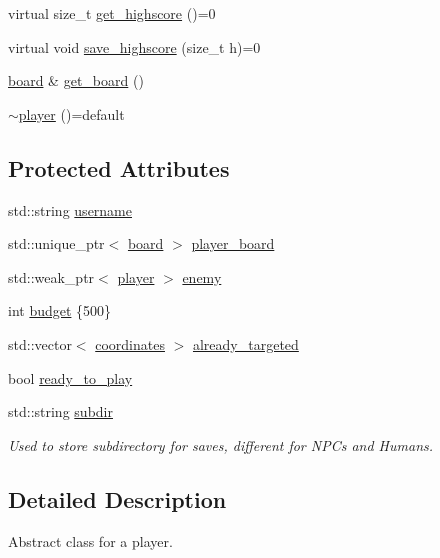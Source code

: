 \begin{DoxyCompactItemize}
\item 
virtual size\+\_\+t \hyperlink{classbattle__ship_1_1player_a9b74e59f4b120d38ad591dba6a1d1ba7}{get\+\_\+highscore} ()=0
\item 
virtual void \hyperlink{classbattle__ship_1_1player_a928538249678aea5402f8c673671e995}{save\+\_\+highscore} (size\+\_\+t h)=0
\item 
\hyperlink{classbattle__ship_1_1board}{board} \& \hyperlink{classbattle__ship_1_1player_a57dacb55b2c506191d3d8426097c3c6a}{get\+\_\+board} ()
\item 
\hyperlink{classbattle__ship_1_1player_afbb6b6e880864bf7a36f21a95665a6c7}{$\sim$player} ()=default
\end{DoxyCompactItemize}
\subsection*{Protected Attributes}
\begin{DoxyCompactItemize}
\item 
std\+::string \hyperlink{classbattle__ship_1_1player_aed786567891bcafecb8610e12fb5d413}{username}
\item 
std\+::unique\+\_\+ptr$<$ \hyperlink{classbattle__ship_1_1board}{board} $>$ \hyperlink{classbattle__ship_1_1player_a7a463dddbc0cd8e9dfa3d2c41687e59e}{player\+\_\+board}
\item 
std\+::weak\+\_\+ptr$<$ \hyperlink{classbattle__ship_1_1player}{player} $>$ \hyperlink{classbattle__ship_1_1player_af01292346caaf209039b6490ae18d8aa}{enemy}
\item 
int \hyperlink{classbattle__ship_1_1player_a01f047aac5fcca92ff1e42d4d1e398c9}{budget} \{500\}
\item 
std\+::vector$<$ \hyperlink{structbattle__ship_1_1coordinates}{coordinates} $>$ \hyperlink{classbattle__ship_1_1player_ac0905b76a660cd06e5fd45f4960d48f9}{already\+\_\+targeted}
\item 
bool \hyperlink{classbattle__ship_1_1player_a48a3f8c692c7ea1def384c39b9b65e85}{ready\+\_\+to\+\_\+play}
\item 
std\+::string \hyperlink{classbattle__ship_1_1player_a5cb155ee3d722244c44bf71e5e2440c4}{subdir}
\begin{DoxyCompactList}\small\item\em Used to store subdirectory for saves, different for N\+P\+Cs and Humans. \end{DoxyCompactList}\end{DoxyCompactItemize}


\subsection{Detailed Description}
Abstract class for a player. 

